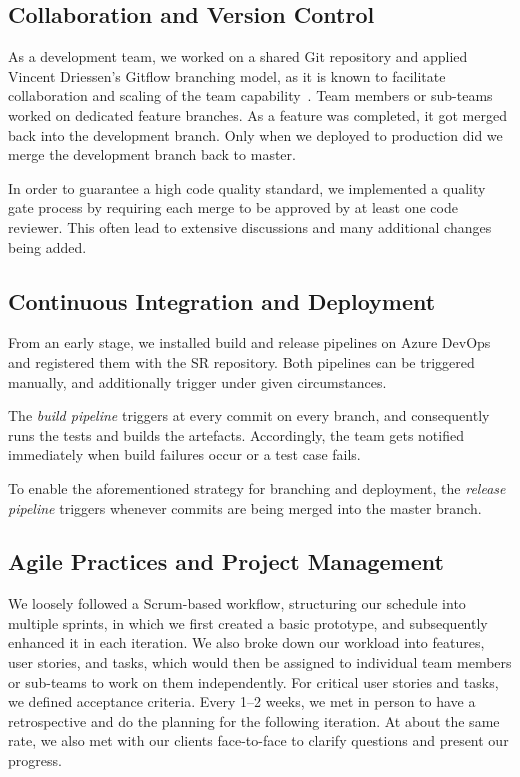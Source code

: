 \documentclass[sigconf]{acmart}
\begin{document}
\subsection{Collaboration and Version Control}
\label{sec:version-control}

As a development team, we worked on a shared Git repository and applied Vincent Driessen's Gitflow branching model, as it is known to facilitate collaboration and scaling of the team capability~\cite{git-flow}. Team members or sub-teams worked on dedicated feature branches. As a feature was completed, it got merged back into the development branch. Only when we deployed to production did we merge the development branch back to master.

In order to guarantee a high code quality standard, we implemented a quality gate process by requiring each merge to be approved by at least one code reviewer. This often lead to extensive discussions and many additional changes being added.


\subsection{Continuous Integration and Deployment}
\label{sec:cicd}

From an early stage, we installed build and release pipelines on Azure DevOps and registered them with the SR repository. Both pipelines can be triggered manually, and additionally trigger under given circumstances.

The \textit{build pipeline} triggers at every commit on every branch, and consequently runs the tests and builds the artefacts. Accordingly, the team gets notified immediately when build failures occur or a test case fails.

To enable the aforementioned strategy for branching and deployment, the \textit{release pipeline} triggers whenever commits are being merged into the master branch.


\subsection{Agile Practices and Project Management}
\label{sec:agile}

We loosely followed a Scrum-based workflow, structuring our schedule into multiple sprints, in which we first created a basic prototype, and subsequently enhanced it in each iteration. We also broke down our workload into features, user stories, and tasks, which would then be assigned to individual team members or sub-teams to work on them independently. For critical user stories and tasks, we defined acceptance criteria. %
%
Every 1--2 weeks, we met in person to have a retrospective and do the planning for the following iteration. At about the same rate, we also met with our clients face-to-face to clarify questions and present our progress.
\end{document}
